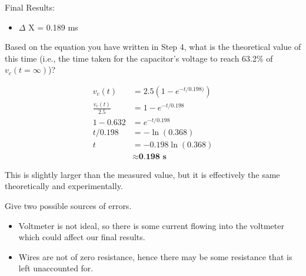 \documentclass[a4paper,12pt,oneside, tikz]{book}
\begin{document}
Final Results:
\begin{itemize}
\item $\Delta$ X = 0.189 ms
\end{itemize}

\begin{tcolorbox}
Based on the equation you have written in Step 4, what is the theoretical value of this time (i.e., the time taken for the capacitor’s voltage to reach 63.2\% of $v_c(t = \infty)$)?


\begin{align*}
v_c(t) &= 2.5(1 - e^{-t/0.198)}) \\
\frac{v_c(t)}{2.5} &= 1 - e^{-t/0.198} \\
1 - 0.632 &= e^{-t/0.198} \\
t/0.198 &= -\ln \left(0.368 \right) \\
t &= -0.198\ln \left(0.368 \right) \\
&\approx \textbf{0.198 s}
\end{align*}

This is slightly larger than the measured value, but it is effectively the same theoretically and experimentally.
\end{tcolorbox}

\begin{tcolorbox}
Give two possible sources of errors.
\begin{itemize}
    \item Voltmeter is not ideal, so there is some current flowing into the voltmeter which could affect our final results.
    \item Wires are not of zero resistance, hence there may be some resistance that is left unaccounted for.
\end{itemize}
\end{tcolorbox}
\end{document}
